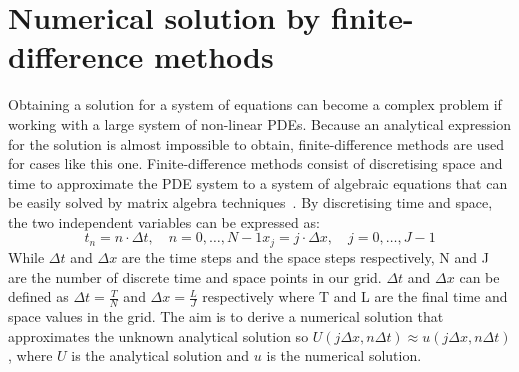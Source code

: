 \section{Numerical solution by finite-difference methods}\label{numerical_methods}
Obtaining a solution for a system of equations can become a complex problem if working with a large system of non-linear PDEs.
Because an analytical expression for the solution is almost impossible to obtain, finite-difference methods are used for cases like this one.
Finite-difference methods consist of discretising space and time to approximate the PDE system to a system of algebraic equations that can be easily solved by matrix algebra techniques~\parencite{Morton1994}.
By discretising time and space, the two independent variables can be expressed as:
\begin{subequations}
    \begin{equation}
        t_{n} = n \cdot \Delta t, \quad n=0,\dots,N-1
    \end{equation}
    \begin{equation}
        x_{j} = j \cdot \Delta x, \quad j=0, \dots,J-1
    \end{equation}
\end{subequations}
While $\Delta t$ and $\Delta x$ are the time steps and the space steps respectively, N and J are the number of discrete time and space points in our grid.
$\Delta t$ and $\Delta x$ can be defined as $ \Delta t = \frac{T}{N}$ and $\Delta x= \frac{L}{J}$ respectively where T and L are the final time and space values in the grid.
The aim is to derive a numerical solution that approximates the unknown analytical solution so $U(j\Delta x, n\Delta t)\approx u( j\Delta x, n\Delta t)$, where $U$ is the analytical solution and $u$ is the numerical solution.

